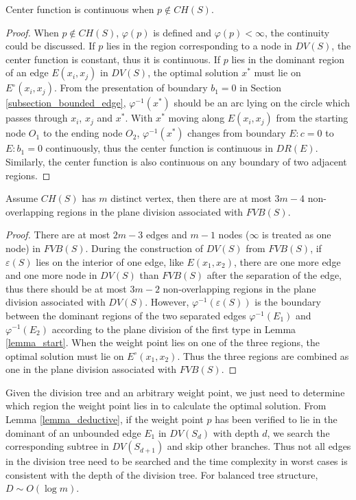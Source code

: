 \documentclass[final,3p,times]{elsarticle}
\begin{document}
\begin{Theorem}
Center function is continuous when $p\notin CH(S)$.
\end{Theorem}
\begin{proof}
When $p\notin CH(S)$, $\varphi(p)$ is defined and $\varphi(p)<\infty$, the continuity could be discussed. If $p$ lies in the region corresponding to a node in $DV(S)$, the center function is constant, thus it is continuous. If $p$ lies in the dominant region of an edge $E(x_i,x_j)$ in $DV(S)$, the optimal solution $x^*$ must lie on $E^\circ(x_i,x_j)$. From the presentation of boundary $b_1=0$ in Section \ref{subsection_bounded_edge}, $\varphi^{-1}(x^*)$ should be an arc lying on the circle which passes through $x_i$, $x_j$ and $x^*$. With $x^*$ moving along $E(x_i,x_j)$ from the starting node $O_1$ to the ending node $O_2$, $\varphi^{-1}(x^*)$ changes from boundary $E:c=0$ to $E:b_1=0$ continuously, thus the center function is continuous in $DR(E)$. Similarly, the center function is also continuous on any boundary of two adjacent regions.
\end{proof}

\begin{Theorem}
Assume $CH(S)$ has $m$ distinct vertex, then there are at most $3m-4$ non-overlapping regions in the plane division associated with $FVB(S)$.
\end{Theorem}
\begin{proof}
There are at most $2m-3$ edges and $m-1$ nodes ($\infty$ is treated as one node) in $FVB(S)$. During the construction of $DV(S)$ from $FVB(S)$, if $\varepsilon(S)$ lies on the interior of one edge, like $E(x_1,x_2)$, there are one more edge and one more node in $DV(S)$ than $FVB(S)$ after the separation of the edge, thus there should be at most $3m-2$ non-overlapping regions in the plane division associated with $DV(S)$. However, $\varphi^{-1}(\varepsilon(S))$ is the boundary between the dominant regions of the two separated edges $\varphi^{-1}(E_1)$ and $\varphi^{-1}(E_2)$ according to the plane division of the first type in Lemma \ref{lemma_start}. When the weight point lies on one of the three regions, the optimal solution must lie on $E^\circ(x_1,x_2)$. Thus the three regions are combined as one in the plane division associated with $FVB(S)$.
\end{proof}

Given the division tree and an arbitrary weight point, we just need to determine which region the weight point lies in to calculate the optimal solution. From Lemma \ref{lemma_deductive}, if the weight point $p$ has been verified to lie in the dominant of an unbounded edge $E_1$ in $DV(S_d)$ with depth $d$, we search the corresponding subtree in $DV(S_{d+1})$ and skip other branches. Thus not all edges in the division tree need to be searched and the time complexity in worst cases is consistent with the depth of the division tree. For balanced tree structure, $D\sim O(\log m)$.
\end{document}
